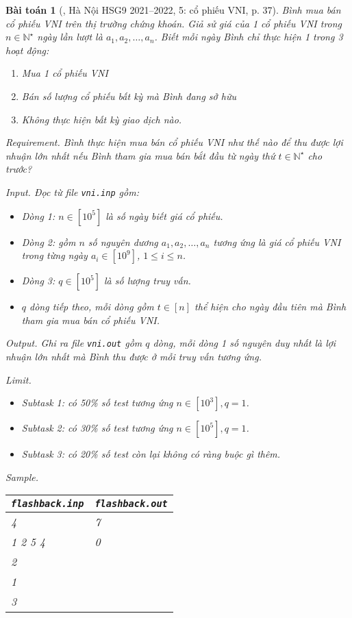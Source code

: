 \documentclass{article}
\newtheorem{baitoan}{Bài toán}
\begin{document}
\begin{baitoan}[\cite{Trung_THCS_Tin}, Hà Nội HSG9 2021--2022, 5: cổ phiếu VNI, p. 37]
	Bình mua bán cổ phiếu VNI trên thị trường chứng khoán. Giả sử giá của 1 cổ phiếu VNI trong $n\in\mathbb{N}^\star$ ngày lần lượt là $a_1,a_2,\ldots,a_n$. Biết mỗi ngày Bình chỉ thực hiện 1 trong 3 hoạt động:
	\begin{enumerate}
		\item Mua 1 cổ phiếu VNI
		\item Bán số lượng cổ phiếu bất kỳ mà Bình đang sở hữu
		\item Không thực hiện bất kỳ giao dịch nào.
	\end{enumerate}
	\item {\sf Requirement.} Bình thực hiện mua bán cổ phiếu VNI như thế nào để thu được lợi nhuận lớn nhất nếu Bình tham gia mua bán bắt đầu từ ngày thứ $t\in\mathbb{N}^\star$ cho trước?
	\item {\sf Input.} Đọc từ file {\tt vni.inp} gồm:
	\begin{itemize}
		\item Dòng 1: $n\in[10^5]$ là số ngày biết giá cổ phiếu.
		\item Dòng 2: gồm $n$ số nguyên dương $a_1,a_2,\ldots,a_n$ tương ứng là giá cổ phiếu VNI trong từng ngày $a_i\in[10^9]$, $1\le i\le n$.
		\item Dòng 3: $q\in[10^5]$ là số lượng truy vấn.
		\item $q$ dòng tiếp theo, mỗi dòng gồm $t\in[n]$ thể hiện cho ngày đầu tiên mà Bình tham gia mua bán cổ phiếu VNI.
	\end{itemize}
	\item {\sf Output.} Ghi ra file {\tt vni.out} gồm $q$ dòng, mỗi dòng 1 số nguyên duy nhất là lợi nhuận lớn nhất mà Bình thu được ở mỗi truy vấn tương ứng.
	\item {\sf Limit.}
	\begin{itemize}
		\item Subtask 1: có 50\% số test tương ứng $n\in[10^3],q = 1$.
		\item Subtask 2: có 30\% số test tương ứng $n\in[10^5],q = 1$.
		\item Subtask 3: có 20\% số test còn lại không có ràng buộc gì thêm.
	\end{itemize}
	\item {\sf Sample.}
	\begin{table}[H]
		\centering
		\begin{tabular}{|l|l|}
			\hline
			{\tt flashback.inp} & {\tt flashback.out} \\
			\hline
			4 & 7 \\
			1 2 5 4 & 0 \\
			2 & \\
			1 & \\
			3 & \\
			\hline
		\end{tabular}
	\end{table}
\end{baitoan}
\end{document}
